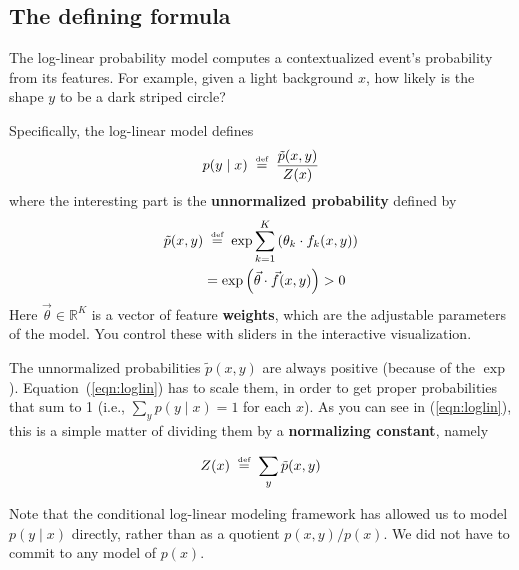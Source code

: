 \documentclass[11pt]{article}
\newcommand{\defeq}{\;\stackrel{\mbox{\tiny def}}{=}\;}
\newcommand{\vtheta}{\vec{\theta}}
\newcommand{\ph}{\hat{p}}
\newcommand{\ptilde}{\tilde{p}}
\newcommand{\Real}{{\mathbb R}}
\begin{document}
\subsection{The defining formula}\label{sec:formula}


The log-linear probability model computes a contextualized
event's probability from its features.
For example, given a
light background $x$, how likely is the shape $y$ to be a dark striped circle?

Specifically, the log-linear model defines
\begin{equation}\label{eqn:loglin}
  p(y \mid x) \defeq \frac{\ptilde(x,y)}{Z(x)}
\end{equation}
where the interesting part is the {\bf unnormalized probability}
defined by
\begin{align}\label{eqn:unnorm}
  \ptilde(x,y) &\defeq \exp \sum_{k=1}^K \left( \theta_k \cdot f_k(x,y) \right)  \\
         &= \exp \left(\vtheta \cdot \vec{f}(x,y)\right) > 0
\end{align}
Here $\vtheta \in \Real^K$ is a vector of feature {\bf weights}, which
are the adjustable parameters of the model.  You control these
with sliders in the interactive visualization.  

\medskip
The unnormalized probabilities $\ptilde(x,y)$ are always positive (because
of the $\exp$).  Equation~(\ref{eqn:loglin}) has to scale them, in
order to get proper probabilities that sum to 1 (i.e., $\sum_y
p(y\mid x) = 1$ for each $x$).  As you can see in
(\ref{eqn:loglin}), this is a simple matter of dividing them by a {\bf
  normalizing constant}, namely

\vspace{-16pt}
\begin{equation}
  Z(x) \defeq \sum_y \ptilde(x,y)
\end{equation}

Note that the conditional log-linear modeling framework has allowed us
to model $p(y \mid x)$ directly, rather than as a quotient $p(x,y) /
p(x)$.  We did not have to commit to any model of $p(x)$.
\end{document}
